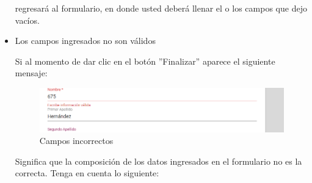 \begin{itemize}
\begin{figure}[H]
                         \end{figure}

                           regresará  al formulario, en donde usted deberá llenar el o los campos que dejo vacíos.






                        \item Los campos ingresados no son válidos

                            Si al momento de dar clic en el botón ''Finalizar'' aparece el siguiente mensaje:
                            \clearpage
                                \begin{figure}[H]
                            \centering
                            \includegraphics[width=0.4\linewidth]{images/SP1/MSG35}
                            \caption{Campos incorrectos}
                            \label{mensaje35}

                         \end{figure}


                            Significa que la composición de los datos ingresados en el formulario no es la correcta. Tenga en cuenta lo siguiente:


\end{itemize}
